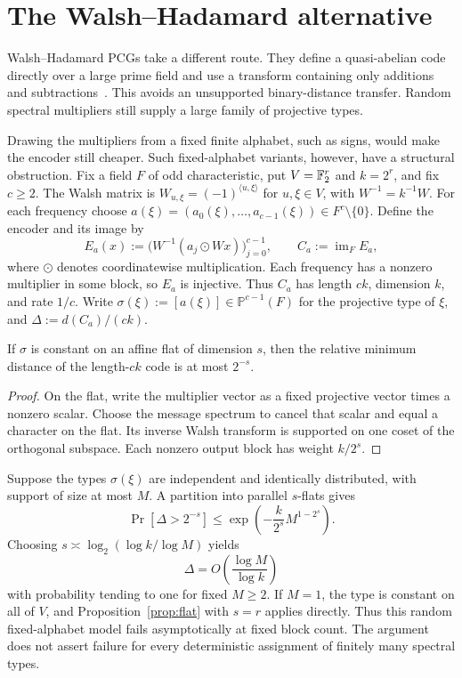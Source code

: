 \section{The Walsh--Hadamard alternative}\label{sec:wht}

Walsh--Hadamard PCGs take a different route.  They define a quasi-abelian code
directly over a large prime field and use a transform containing only additions
and subtractions~\cite{wht26}.  This avoids an unsupported binary-distance
transfer.  Random spectral multipliers still supply a large family of
projective types.

Drawing the multipliers from a fixed finite alphabet, such as signs, would
make the encoder still cheaper.  Such fixed-alphabet variants, however, have a
structural obstruction. Fix a field $F$ of odd characteristic, put
$V=\mathbb F_2^r$ and $k=2^r$, and fix $c\ge2$.
The Walsh matrix is $W_{u,\xi}=(-1)^{\langle u,\xi\rangle}$ for
$u,\xi\in V$, with $W^{-1}=k^{-1}W$. For each frequency choose
$a(\xi)=(a_0(\xi),\ldots,a_{c-1}(\xi))\in F^c\setminus\{0\}$.
Define the encoder and its image by
\[
 E_a(x):=\bigl(W^{-1}(a_j\odot Wx)\bigr)_{j=0}^{c-1},
 \qquad C_a:=\operatorname{im}_F E_a,
\]
where $\odot$ denotes coordinatewise multiplication.
Each frequency has a nonzero multiplier in some block, so $E_a$ is
injective. Thus $C_a$ has length $ck$, dimension $k$, and rate $1/c$.
Write $\sigma(\xi):=[a(\xi)]\in\mathbb P^{c-1}(F)$ for the projective type
of $\xi$, and $\Delta:=d(C_a)/(ck)$.

\begin{proposition}\label{prop:flat}
If $\sigma$ is constant on an affine flat of dimension $s$, then the relative
minimum distance of the length-$ck$ code is at most $2^{-s}$.
\end{proposition}

\begin{proof}
On the flat, write the multiplier vector as a fixed projective vector times a
nonzero scalar.  Choose the message spectrum to cancel that scalar and equal a
character on the flat.  Its inverse Walsh transform is supported on one coset
of the orthogonal subspace.  Each nonzero output block has weight $k/2^s$.
\end{proof}

Suppose the types $\sigma(\xi)$ are independent and identically distributed,
with support of size at most $M$.  A
partition into parallel $s$-flats gives
\[
  \Pr[\Delta>2^{-s}]
  \le
  \exp\left(-\frac{k}{2^s}M^{1-2^s}\right).
\]
Choosing $s\asymp\log_2(\log k/\log M)$ yields
\[
  \Delta=O\left(\frac{\log M}{\log k}\right)
\]
with probability tending to one for fixed $M\ge2$.  If $M=1$, the type is
constant on all of $V$, and Proposition~\ref{prop:flat} with $s=r$ applies
directly.  Thus this random fixed-alphabet model fails asymptotically at
fixed block count.  The argument does not assert failure for every
deterministic assignment of finitely many spectral types.

